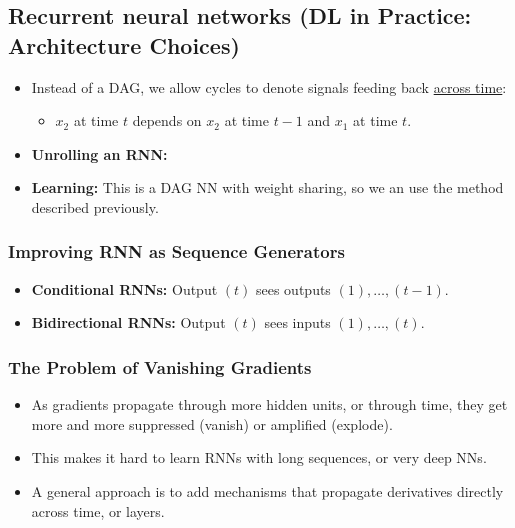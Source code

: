\subsection{Recurrent neural networks (DL in Practice: Architecture Choices)}
\begin{summary}
    \begin{itemize}
        \item Instead of a DAG, we allow cycles to denote signals feeding back \underline{across time}:
        \begin{itemize}
            \item \( x_2 \) at time \( t \) depends on \( x_2 \) at time \( t-1 \) and \( x_1 \) at time \( t \).
        \end{itemize}
    
        \item \textbf{Unrolling an RNN:}
    
        \item \textbf{Learning:} This is a DAG NN with weight sharing, so we an use the method described previously.
    \end{itemize}
\end{summary}

\subsubsection{Improving RNN as Sequence Generators}
\begin{summary}
    \begin{itemize}
        \item \textbf{Conditional RNNs:} Output $(t)$ sees outputs $(1), \ldots, (t-1)$.
        \item \textbf{Bidirectional RNNs:} Output $(t)$ sees inputs $(1), \ldots, (t)$.
    \end{itemize}
\end{summary}

\subsubsection{The Problem of Vanishing Gradients}
\begin{summary}
    \begin{itemize}
        \item As gradients propagate through more hidden units, or through time, they get more and more suppressed (vanish) or amplified (explode).
        \item This makes it hard to learn RNNs with long sequences, or very deep NNs.
        \item A general approach is to add mechanisms that propagate derivatives directly across time, or layers.
    \end{itemize}  
\end{summary}

